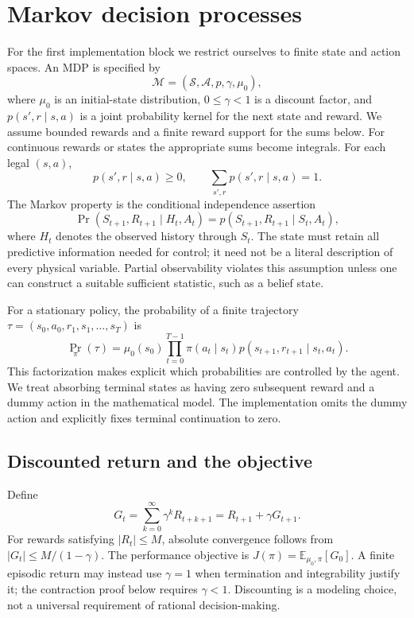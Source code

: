 \documentclass[11pt,a4paper]{article}
\newcommand{\E}{\mathbb E}
\newcommand{\Sset}{\mathcal S}
\newcommand{\Aset}{\mathcal A}
\begin{document}
\section{Markov decision processes}
For the first implementation block we restrict ourselves to finite state and action spaces. An MDP is specified by
\[
\mathcal M=(\Sset,\Aset,p,\gamma,\mu_0),
\]
where $\mu_0$ is an initial-state distribution, $0\leq\gamma<1$ is a discount factor, and $p(s',r\mid s,a)$ is a joint probability kernel for the next state and reward. We assume bounded rewards and a finite reward support for the sums below. For continuous rewards or states the appropriate sums become integrals. For each legal $(s,a)$,
\[
 p(s',r\mid s,a)\geq 0,\qquad \sum_{s',r}p(s',r\mid s,a)=1.
\]
The Markov property is the conditional independence assertion
\[
 \Pr(S_{t+1},R_{t+1}\mid H_t,A_t)=p(S_{t+1},R_{t+1}\mid S_t,A_t),
\]
where $H_t$ denotes the observed history through $S_t$. The state must retain all predictive information needed for control; it need not be a literal description of every physical variable. Partial observability violates this assumption unless one can construct a suitable sufficient statistic, such as a belief state.

For a stationary policy, the probability of a finite trajectory $\tau=(s_0,a_0,r_1,s_1,\ldots,s_T)$ is
\[
 \Pr_\pi(\tau)=\mu_0(s_0)\prod_{t=0}^{T-1}\pi(a_t\mid s_t)p(s_{t+1},r_{t+1}\mid s_t,a_t).
\]
This factorization makes explicit which probabilities are controlled by the agent. We treat absorbing terminal states as having zero subsequent reward and a dummy action in the mathematical model. The implementation omits the dummy action and explicitly fixes terminal continuation to zero.

\subsection{Discounted return and the objective}
Define
\begin{equation}
 G_t=\sum_{k=0}^\infty\gamma^kR_{t+k+1}=R_{t+1}+\gamma G_{t+1}.
 \label{eq:return}
\end{equation}
For rewards satisfying $|R_t|\leq M$, absolute convergence follows from $|G_t|\leq M/(1-\gamma)$. The performance objective is $J(\pi)=\E_{\mu_0,\pi}[G_0]$. A finite episodic return may instead use $\gamma=1$ when termination and integrability justify it; the contraction proof below requires $\gamma<1$. Discounting is a modeling choice, not a universal requirement of rational decision-making.
\end{document}
